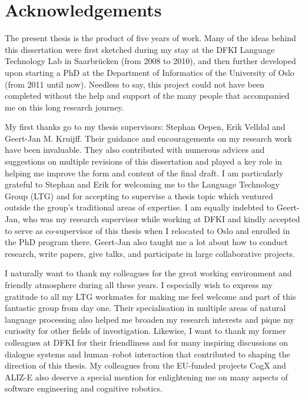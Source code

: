 \chapter*{Acknowledgements}

The present thesis is the product of five years of work. Many of the ideas behind this dissertation were first sketched during my stay at the DFKI Language Technology Lab in Saarbr\"ucken (from 2008 to 2010), and then further developed upon starting a PhD at the Department of Informatics of the University of Oslo (from 2011 until now).  Needless to say, this project could not have been completed without the help and support of the many people that accompanied me on this long research journey.

My first thanks go to my thesis supervisors: Stephan Oepen, Erik Velldal and Geert-Jan M. Kruijff.  Their guidance and encouragements on my research work have been invaluable.  They also contributed with numerous advices and suggestions on multiple revisions of this dissertation and played a key role in helping me improve the form and content of the final draft. I am particularly grateful to Stephan and Erik for welcoming me to the Language Technology Group (LTG) and for accepting to supervise a thesis topic which ventured outside the group's traditional areas of expertise. I am equally indebted to Geert-Jan, who was my research supervisor while working at DFKI and kindly accepted to serve as co-supervisor of this thesis when I relocated to Oslo and enrolled in the PhD program there. Geert-Jan  also taught me a lot about how to conduct research, write papers, give talks, and participate in large collaborative projects.

I naturally want to thank my colleagues for the great working environment and friendly atmosphere during all these years.  I especially wish to express my gratitude to all my LTG workmates for making me feel welcome and part of this fantastic group from day one. Their specialisation in multiple areas of natural language processing also helped me broaden my research interests and pique my curiosity for other fields of investigation.  Likewise, I want to thank my former colleagues at DFKI for their friendliness and for many inspiring discussions on dialogue systems and human--robot interaction that contributed to shaping the direction of this thesis. My colleagues from the EU-funded projects CogX and ALIZ-E also deserve a special mention for enlightening me on many aspects of software engineering and cognitive robotics.

